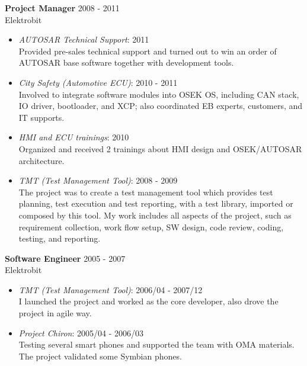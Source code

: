 \textbf{Project Manager} \hfill 2008 - 2011\\
        Elektrobit
        \begin{itemize}  \itemsep -2pt %
            \item {\em AUTOSAR Technical Support}: 2011 \\
                    Provided pre-sales technical support
                    and turned out to win an order of AUTOSAR base software together with development tools.
            \item {\em City Safety (Automotive ECU)}: 2010 - 2011 \\
                    Involved to integrate software modules into OSEK OS,
                    including CAN stack, IO driver, bootloader, and XCP;
                    also coordinated EB experts, customers, and IT supports.
            \item {\em HMI and ECU trainings}: 2010\\
                Organized and received 2 trainings about HMI design and OSEK/AUTOSAR architecture.
            \item {\em TMT (Test Management Tool)}: 2008 - 2009 \\
                    The project was to create a test management tool
                    which provides test planning, test execution and test reporting,
                    with a test library, imported or composed by this tool.
                    My work includes all aspects of the project,
                    such as requirement collection, work flow setup, SW design, code review, coding, testing, and reporting.
        \end{itemize}
 
\textbf{Software Engineer} \hfill 2005 - 2007 \\
        Elektrobit
        \begin{itemize}  \itemsep -2pt %
            \item {\em TMT (Test Management Tool)}: 2006/04 - 2007/12 \\ 
            I launched the project and worked as the core developer, also drove
            the project in agile way.
            \item {\em Project Chiron}: 2005/04 - 2006/03 \\
                Testing several smart phones and supported the team with OMA materials.
                The project validated some Symbian phones.
        \end{itemize}
 
